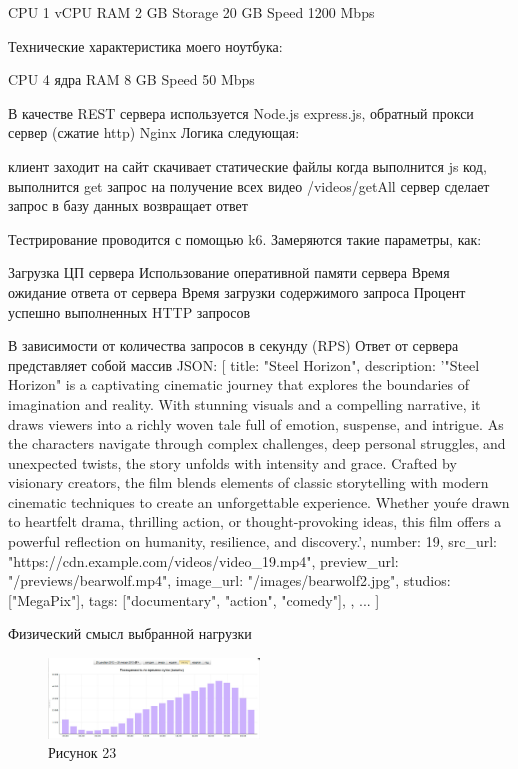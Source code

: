\documentclass[12pt]{article}
\begin{document}
CPU 1 vCPU
RAM 2 GB
Storage 20 GB
Speed 1200 Mbps

Технические характеристика моего ноутбука:

CPU 4 ядра
RAM 8 GB
Speed 50 Mbps

В качестве REST сервера используется Node.js express.js, обратный прокси сервер (сжатие http) Nginx
Логика следующая:

клиент заходит на сайт
скачивает статические файлы
когда выполнится js код, выполнится get запрос на получение всех видео /videos/getAll
сервер сделает запрос в базу данных
возвращает ответ

Тестрирование проводится с помощью k6. Замеряются такие параметры, как:

Загрузка ЦП сервера
Использование оперативной памяти сервера
Время ожидание ответа от сервера 
Время загрузки содержимого запроса
Процент успешно выполненных HTTP запросов 

В зависимости от количества запросов в секунду (RPS)
Ответ от сервера представляет собой массив JSON:
[
  {
    title: "Steel Horizon",
    description:
      '"Steel Horizon" is a captivating cinematic journey that explores the boundaries of imagination and reality. With stunning visuals and a compelling narrative, it draws viewers into a richly woven tale full of emotion, suspense, and intrigue. As the characters navigate through complex challenges, deep personal struggles, and unexpected twists, the story unfolds with intensity and grace. Crafted by visionary creators, the film blends elements of classic storytelling with modern cinematic techniques to create an unforgettable experience. Whether you\'re drawn to heartfelt drama, thrilling action, or thought-provoking ideas, this film offers a powerful reflection on humanity, resilience, and discovery.',
    number: 19,
    src_url: "https://cdn.example.com/videos/video_19.mp4",
    preview_url: "/previews/bearwolf.mp4",
    image_url: "/images/bearwolf2.jpg",
    studios: ["MegaPix"],
    tags: ["documentary", "action", "comedy"],
  },
  ...
]

Физический смысл выбранной нагрузки
\begin{figure}[h!]
\centering
\includegraphics[width=0.5\textwidth]{../images/pedsovet.png}
\caption{Рисунок 23}
\end{figure}
\end{document}
